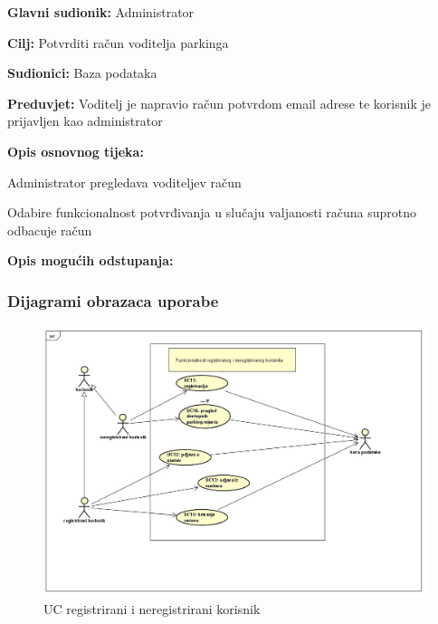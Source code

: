 \begin{packed_item}
\begin{packed_item}
    					\item \textbf{Glavni sudionik: } Administrator
    					\item  \textbf{Cilj:} Potvrditi račun voditelja parkinga
    					\item  \textbf{Sudionici:} Baza podataka
    					\item  \textbf{Preduvjet:} Voditelj je napravio račun potvrdom email adrese te korisnik je prijavljen kao administrator
    					\item  \textbf{Opis osnovnog tijeka:}
    					
    					\item[] \begin{packed_enum}
    						
    						\item Administrator pregledava voditeljev račun
    						\item Odabire funkcionalnost potvrđivanja u slučaju valjanosti računa suprotno odbacuje račun

    					\end{packed_enum}
    					
    					\item  \textbf{Opis mogućih odstupanja:}
    					
    					
    				\end{packed_item}
    				
				
					
				\subsubsection{Dijagrami obrazaca uporabe}
					
					\begin{figure}[H]

						\includegraphics[width=\textwidth]{slike/slika.jpeg} %
						\centering
						\caption{UC registrirani i neregistrirani korisnik}
						\label{fig:registrirani4312}
					\end{figure}
					

\end{packed_item}

